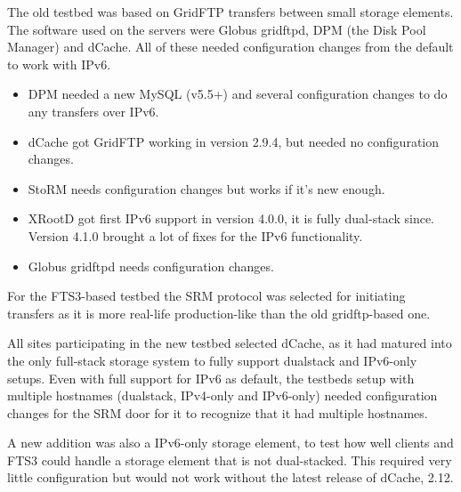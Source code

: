 The old testbed was based on GridFTP\cite{GFTP1.0, GFTP2.0} transfers between small storage elements. The software used on the servers were Globus gridftpd, 
DPM (the Disk Pool Manager) and dCache. 
All of these needed configuration changes from the default to work with IPv6.

\begin{itemize}
\item DPM needed a new MySQL (v5.5+) and several configuration changes to do any transfers over IPv6.
\item dCache got GridFTP working in version 2.9.4, but needed no configuration changes.
\item StoRM needs configuration changes but works if it's new enough.
\item XRootD got first IPv6 support in version 4.0.0, it is fully dual-stack since. Version 4.1.0 brought a lot of fixes for the IPv6 functionality.
\item Globus gridftpd needs configuration changes.
\end{itemize}

For the FTS3-based testbed the SRM protocol \cite{SRM2.2} was selected for initiating transfers as it is more real-life production-like 
than the old gridftp-based one. 

All sites participating in the new testbed selected dCache, as it had matured into the only full-stack storage 
system to fully support dualstack and IPv6-only setups. Even with full support for IPv6 as default, the testbeds setup with 
multiple hostnames (dualstack, IPv4-only and IPv6-only) needed configuration changes for the SRM door for it to recognize that it had multiple hostnames.

A new addition was also a IPv6-only storage element, to test how well clients and FTS3 could handle a storage element that is not dual-stacked.
This required very little configuration but would not work without the latest release of dCache, 2.12.



